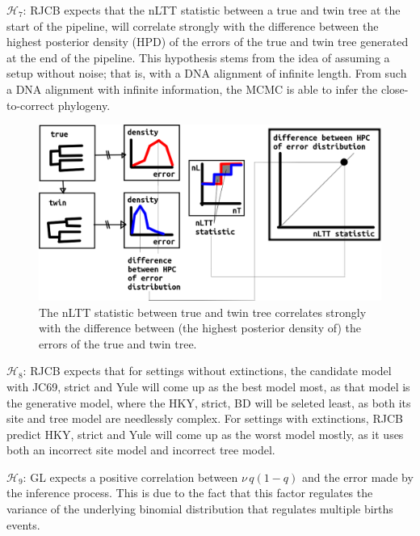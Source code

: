 $\mathcal{H}_7$: RJCB expects that the nLTT statistic between a true and twin
tree at the start of the pipeline,
will correlate strongly with the difference
between the highest posterior density (HPD) of the 
errors of the true and twin tree 
generated at the end of the pipeline. 
This hypothesis
stems from the idea of assuming a setup without noise; that is, with
a DNA alignment of infinite length. From such a DNA alignment 
with infinite information, the MCMC
is able to infer the close-to-correct phylogeny.

\begin{figure}[!htbp]
  \includegraphics[width=\textwidth]{20191126_nltt_as_proxy.png}
  \caption{
    The nLTT statistic between true and twin tree correlates strongly
    with the difference between (the highest posterior density
    of) the errors of the true and twin tree.
  }
  \label{fig:nltt_as_proxy}
\end{figure}

$\mathcal{H}_8$: RJCB expects that for settings without extinctions,
the candidate model with JC69, strict and Yule will come up as the best
model most, as that model is the generative model, where the HKY, strict, BD
will be seleted least, as both its site and tree model are needlessly complex.
For settings with extinctions, RJCB predict HKY, strict and Yule will come up 
as the worst model mostly, as it uses both an incorrect site model and incorrect
tree model. 

$\mathcal{H}_9$: GL expects a positive correlation between $\nu \, q(1-q)$ and the error made by the inference process. This is due to the fact that this factor regulates the variance of the underlying binomial distribution that regulates multiple births events.